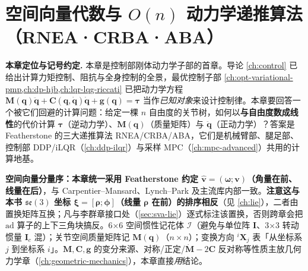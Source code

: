 \chapter{空间向量代数与 \texorpdfstring{$O(n)$}{O(n)} 动力学递推算法（RNEA·CRBA·ABA）}
\label{ch:spatial-dynamics}


\begin{note}
\textbf{本章定位与记号约定.}\;
本章是控制部刚体动力学子部的首章。导论 \cref{ch:control} 已给出计算力矩控制、阻抗与全身控制的全景，最优控制子部 \cref{ch:opt-variational-pmp,ch:dp-hjb,ch:lqr-lqg-riccati} 已把动力学方程 $\mathbf M(\mathbf q)\ddot{\mathbf q}+\mathbf C(\mathbf q,\dot{\mathbf q})\dot{\mathbf q}+\mathbf g(\mathbf q)=\boldsymbol\tau$ 当作\emph{已知对象}来设计控制律。本章要回答一个被它们回避的计算问题：给定一棵 $n$ 自由度的关节树，如何以\textbf{与自由度数成线性}的代价计算 $\boldsymbol\tau$（逆动力学）、$\mathbf M(\mathbf q)$（质量矩阵）与 $\ddot{\mathbf q}$（正动力学）？答案是 Featherstone 的三大递推算法 RNEA/CRBA/ABA\cite{featherstone2008rigid}，它们是机械臂部、腿足部、控制部 DDP/iLQR（\cref{ch:ddp-ilqr}）与采样 MPC（\cref{ch:mpc-advanced}）共用的计算地基。

\textbf{空间向量分量序：本章统一采用 Featherstone 约定 $\hat{\mathbf v}=(\boldsymbol\omega;\mathbf v)$（角量在前、线量在后）}，与 Carpentier--Mansard\cite{carpentier2018analytical}、Lynch--Park\cite{lynch2017modern} 及主流库内部一致。\textbf{注意这与本书 $\mathfrak{se}(3)$ 坐标 $\boldsymbol\xi=[\boldsymbol\rho;\boldsymbol\phi]$（线量 $\boldsymbol\rho$ 在前）的排序相反}（见 \cref{ch:lie}），二者由置换矩阵互换；凡与李群章接口处（\cref{sec:sva-lie}）逐式标注该置换，否则跨章会把 $\mathrm{ad}$ 算子的上下三角块搞反。6×6 空间惯性记花体 $\mathcal I$（避免与单位阵 $\mathbf I$、3×3 转动惯量 $\mathbf I_c$ 混）；关节空间质量矩阵记 $\mathbf M(\mathbf q)$（$n\times n$）；变换方向 ${}^i\mathbf X_j$ 表「从坐标系 $j$ 到坐标系 $i$」。$\mathbf M,\mathbf C,\mathbf g$ 的变分来源、对称/正定/$\dot{\mathbf M}-2\mathbf C$ 反对称等性质主放几何力学章（\cref{ch:geometric-mechanics}），本章直接\emph{用}结论。
\end{note}

